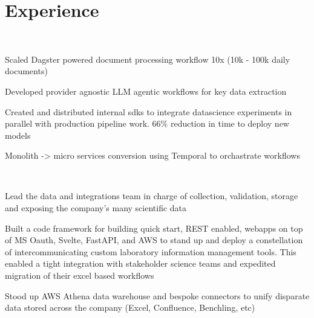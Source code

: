 \documentclass[letterpaper]{deedy-resume-openfont} %
\begin{document}
\begin{minipage}[t]{0.66\textwidth} %


\section{Experience}

\\

\vspace{\topsep}
\begin{tightitemize}
    \item Scaled Dagster powered document processing workflow 10x (10k - 100k daily documents) 
    \item Developed provider agnostic LLM agentic workflows for key data extraction
    \item Created and distributed internal sdks to integrate datascience experiments in parallel with production pipeline work. 66\% reduction in time to deploy new models
    \item Monolith -> micro services conversion using Temporal to orchastrate workflows
\end{tightitemize}
\vspace{\topsep}

\\

\begin{tightitemize}
    \item Lead the data and integrations team in charge of collection, validation, storage and exposing the company's many scientific data
    \item Built a code framework for building quick start, REST enabled, webapps on top of MS Oauth, Svelte, FastAPI, and AWS 
    to stand up and deploy a constellation of intercommunicating custom laboratory information management tools. This enabled a tight integration with stakeholder science teams and expedited migration of their excel based workflows
    \item Stood up AWS Athena data warehouse and bespoke connectors to unify disparate data stored across the company (Excel, Confluence, Benchling, etc) 
\end{tightitemize}
\vspace{\topsep}


\end{minipage}
\end{document}
